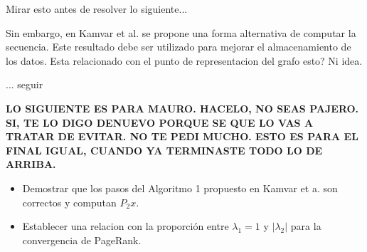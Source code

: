 Mirar esto antes de resolver lo siguiente...

Sin embargo, en Kamvar et al. se propone una forma alternativa de computar la secuencia. Este resultado debe ser utilizado para mejorar el almacenamiento de los datos. Esta relacionado con el punto de representacion del grafo esto? Ni idea.

... seguir

\textbf{LO SIGUIENTE ES PARA MAURO. HACELO, NO SEAS PAJERO. SI, TE LO DIGO DENUEVO PORQUE SE QUE LO VAS A TRATAR DE EVITAR. NO TE PEDI MUCHO. ESTO ES PARA EL FINAL IGUAL, CUANDO YA TERMINASTE TODO LO DE ARRIBA.}

\begin{itemize}
\item Demostrar que los pasos del Algoritmo 1 propuesto en Kamvar et a. son correctos y computan $P_2x$.
\item Establecer una relacion con la proporción entre $\lambda_1 = 1$  y $|\lambda_2|$ para la convergencia de PageRank.
\end{itemize}
\fi


